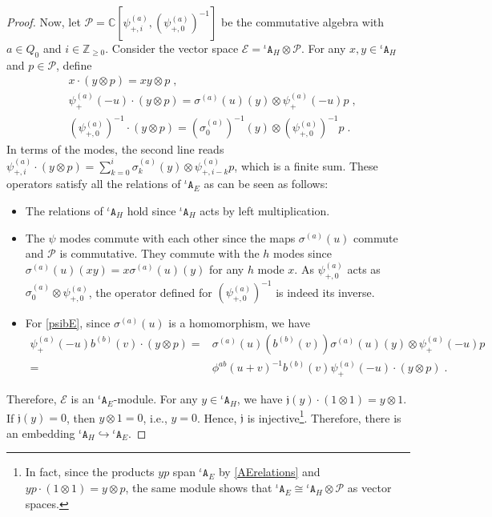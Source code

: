 \documentclass[11pt]{article}
\numberwithin{equation}{section}
\numberwithin{figure}{section}
\numberwithin{table}{section}
\begin{document}
\begin{proof}
	Now, let $\mathcal{P}=\mathbb{C}\left[\psi^{(a)}_{+,i},\left(\psi^{(a)}_{+,0}\right)^{-1}\right]$ be the commutative algebra with $a\in Q_0$ and $i\in\mathbb{Z}_{\geq0}$. Consider the vector space $\mathcal{E}={}^\iota\mathtt{A}_H\otimes\mathcal{P}$. For any $x,y\in{}^\iota\mathtt{A}_H$ and $p\in\mathcal{P}$, define
	\begin{subequations}
		\begin{align}
			&x\cdot(y\otimes p)=xy\otimes p\;,\\
			&\psi^{(a)}_+(-u)\cdot(y\otimes p)=\sigma^{(a)}(u)(y)\otimes\psi^{(a)}_+(-u)p\;,\\
			&\left(\psi^{(a)}_{+,0}\right)^{-1}\cdot(y\otimes p)=\left(\sigma^{(a)}_0\right)^{-1}(y)\otimes\left(\psi^{(a)}_{+,0}\right)^{-1}p\;.
		\end{align}
	\end{subequations}
	In terms of the modes, the second line reads $\psi^{(a)}_{+,i}\cdot(y\otimes p)=\sum\limits_{k=0}^i\sigma^{(a)}_k(y)\otimes\psi^{(a)}_{+,i-k}p$, which is a finite sum. These operators satisfy all the relations of ${}^\iota\mathtt{A}_E$ as can be seen as follows:
	\begin{itemize}
		\item The relations of ${}^\iota\mathtt{A}_H$ hold since ${}^\iota\mathtt{A}_H$ acts by left multiplication.
		\item The $\psi$ modes commute with each other since the maps $\sigma^{(a)}(u)$ commute and $\mathcal{P}$ is commutative. They commute with the $h$ modes since $\sigma^{(a)}(u)(xy)=x\sigma^{(a)}(u)(y)$ for any $h$ mode $x$. As $\psi^{(a)}_{+,0}$ acts as $\sigma^{(a)}_0\otimes\psi^{(a)}_{+,0}$, the operator defined for $\left(\psi^{(a)}_{+,0}\right)^{-1}$ is indeed its inverse.
		\item For \eqref{psibE}, since $\sigma^{(a)}(u)$ is a homomorphism, we have
		\begin{align}
			\psi^{(a)}_+(-u)b^{(b)}(v)\cdot(y\otimes p)=&\sigma^{(a)}(u)\left(b^{(b)}(v)\right)\sigma^{(a)}(u)(y)\otimes\psi^{(a)}_+(-u)p\nonumber\\
			=&\phi^{ab}(u+v)^{-1}b^{(b)}(v)\psi^{(a)}_+(-u)\cdot(y\otimes p)\;.
		\end{align}
	\end{itemize}
	Therefore, $\mathcal{E}$ is an ${}^\iota\mathtt{A}_E$-module. For any $y\in{}^\iota\mathtt{A}_H$, we have $\mathfrak{j}(y)\cdot(1\otimes1)=y\otimes1$. If $\mathfrak{j}(y)=0$, then $y\otimes1=0$, i.e., $y=0$. Hence, $\mathfrak{j}$ is injective\footnote{In fact, since the products $yp$ span ${}^\iota\mathtt{A}_E$ by \eqref{AErelations} and $yp\cdot(1\otimes1)=y\otimes p$, the same module shows that ${}^\iota\mathtt{A}_E\cong{}^\iota\mathtt{A}_H\otimes\mathcal{P}$ as vector spaces.}. Therefore, there is an embedding ${}^\iota\mathtt{A}_H\hookrightarrow{}^\iota\mathtt{A}_E$.


\end{proof}
\end{document}
